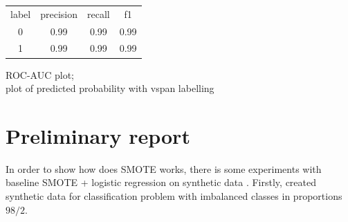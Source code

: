\documentclass{article}
\begin{document}
\begin{tabular}{c|c|c|c}
    label & precision & recall & f1 \\
    0 & 0.99 & 0.99 & 0.99 \\
    1 & 0.99 & 0.99 & 0.99
\end{tabular}

ROC-AUC plot;\\
plot of predicted probability with vspan labelling\\
\section{Preliminary report}
In order to show how does SMOTE works, there is some experiments with baseline SMOTE + logistic regression on synthetic data . Firstly, created synthetic data for classification problem with imbalanced classes in proportions $98/2$.

\begin{figure}[h]
\begin{minipage}[h]{0.49\linewidth}
\end{minipage}
\hfill
\begin{minipage}[h]{0.49\linewidth}
\end{minipage}
\end{figure}
\end{document}
